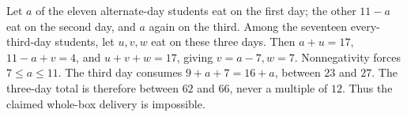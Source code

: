 Let $a$ of the eleven alternate-day students eat on the first day; the other $11-a$ eat on the second day, and $a$ again on the third. Among the seventeen every-third-day students, let $u,v,w$ eat on these three days. Then $a+u=17$, $11-a+v=4$, and $u+v+w=17$, giving $v=a-7,w=7$. Nonnegativity forces $7\le a\le11$. The third day consumes $9+a+7=16+a$, between $23$ and $27$. The three-day total is therefore between $62$ and $66$, never a multiple of $12$. Thus the claimed whole-box delivery is impossible.
